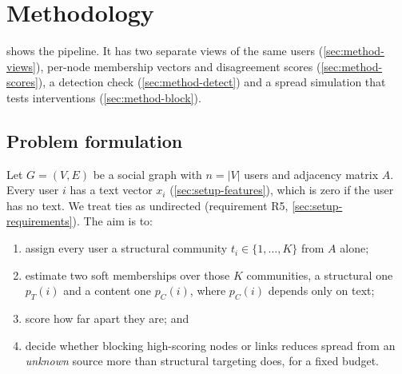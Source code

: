 \section{Methodology}
\label{sec:method}

 shows the pipeline. It has two separate views of the same
users (\cref{sec:method-views}), per-node membership vectors and disagreement scores
(\cref{sec:method-scores}), a detection check (\cref{sec:method-detect}) and a spread
simulation that tests interventions (\cref{sec:method-block}).



\subsection{Problem formulation}
\label{sec:method-problem}
Let $G=(V,E)$ be a social graph with $n=|V|$ users and adjacency matrix $A$. Every
user $i$ has a text vector $x_i$ (\cref{sec:setup-features}), which is zero if the
user has no text. We treat ties as undirected (requirement R5,
\cref{sec:setup-requirements}). The aim is to:
\begin{enumerate}
  \item assign every user a structural community $t_i \in \{1,\dots,K\}$ from $A$ alone;
  \item estimate two soft memberships over those $K$ communities, a structural one
        $p_T(i)$ and a content one $p_C(i)$, where $p_C(i)$ depends only on text;
  \item score how far apart they are; and
  \item decide whether blocking high-scoring nodes or links reduces spread from an
        \emph{unknown} source more than structural targeting does, for a fixed budget.
\end{enumerate}

